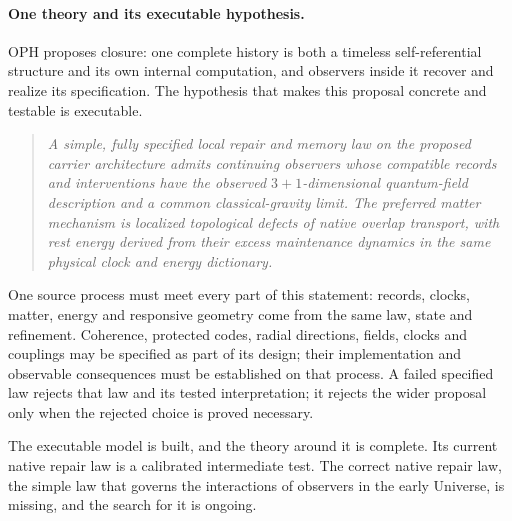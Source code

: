 \paragraph{One theory and its executable hypothesis.}
OPH proposes closure: one complete history is both a timeless
self-referential structure and its own internal computation, and observers
inside it recover and realize its specification. The hypothesis that makes
this proposal concrete and testable is executable.

\begin{quote}\itshape
A simple, fully specified local repair and memory law on the proposed
carrier architecture admits continuing observers whose compatible records
and interventions have the observed \(3+1\)-dimensional quantum-field
description and a common classical-gravity limit. The preferred matter
mechanism is localized topological defects of native overlap transport,
with rest energy derived from their excess maintenance dynamics in the same
physical clock and energy dictionary.
\end{quote}

One source process must meet every part of this statement: records, clocks,
matter, energy and responsive geometry come from the same law, state and
refinement. Coherence, protected codes, radial directions, fields, clocks
and couplings may be specified as part of its design; their implementation
and observable consequences must be established on that process. A failed
specified law rejects that law and its tested interpretation; it rejects the
wider proposal only when the rejected choice is proved necessary.

The executable model is built, and the theory around it is complete. Its
current native repair law is a calibrated intermediate test. The correct
native repair law, the simple law that governs the interactions of observers
in the early Universe, is missing, and the search for it is ongoing.

